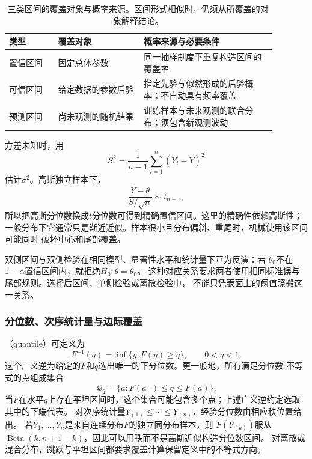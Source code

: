 \begin{table}[htbp]
  \centering
  \begin{tabular}{p{0.16\linewidth}p{0.29\linewidth}p{0.43\linewidth}}
    \toprule
    类型 & 覆盖对象 & 概率来源与必要条件\\
    \midrule
    置信区间 & 固定总体参数 & 同一抽样制度下重复构造区间的覆盖率\\
    可信区间 & 给定数据的参数后验 & 指定先验与似然形成的后验概率；不自动具有频率覆盖\\
    预测区间 & 尚未观测的随机结果 & 训练样本与未来观测的联合分布；须包含新观测波动\\
    \bottomrule
  \end{tabular}
  \caption{三类区间的覆盖对象与概率来源。区间形式相似时，仍须从所覆盖的对象解释结论。}
  \label{tab:statistics-interval-objects}
\end{table}

方差未知时，用
\[
  S^2=\frac1{n-1}\sum_{i=1}^n(Y_i-\overline Y)^2
\]
估计\(\sigma^2\)。高斯独立样本下，
\[
  \frac{\overline Y-\theta}{S/\sqrt n}\sim t_{n-1},
\]
所以把高斯分位数换成\(t\)分位数可得到精确置信区间。这里的精确性依赖高斯性；
一般分布下它通常只是渐近近似。样本很小且分布偏斜、重尾时，机械使用该区间可能同时
破坏中心和尾部覆盖。

双侧区间与双侧检验在相同模型、显著性水平和统计量下互为反演：若
\(\theta_0\)不在\(1-\alpha\)置信区间内，就拒绝\(H_0:\theta=\theta_0\)。
这种对应关系要求两者使用相同标准误与尾部规则。选择后区间、单侧检验或离散检验中，
不能只凭表面上的阈值照搬这一关系。

\subsubsection{分位数、次序统计量与边际覆盖}

（quantile）可定义为
\[
  F^{-1}(q)=\inf\{y:F(y)\geq q\},\qquad 0<q<1.
\]
这个广义逆为给定的\(F\)和\(q\)选出唯一的下分位数。更一般地，所有满足分位数
不等式的点组成集合
\[
  \mathcal Q_q=\{a:F(a^-)\leq q\leq F(a)\}.
\]
当\(F\)在水平\(q\)上存在平坦区间时，这个集合可能包含多个点；上述广义逆约定选取
其中的下端代表。
对次序统计量\(Y_{(1)}\leq\cdots\leq Y_{(n)}\)，经验分位数由相应秩位置给出。
若\(Y_1,\ldots,Y_n\)是来自连续分布\(F\)的独立同分布样本，则
\(F(Y_{(k)})\)服从
\(\operatorname{Beta}(k,n+1-k)\)，因此可以用秩而不是高斯近似构造分位数区间。
对离散或混合分布，跳跃与平坦区间都要求覆盖计算保留定义中的不等式方向。

